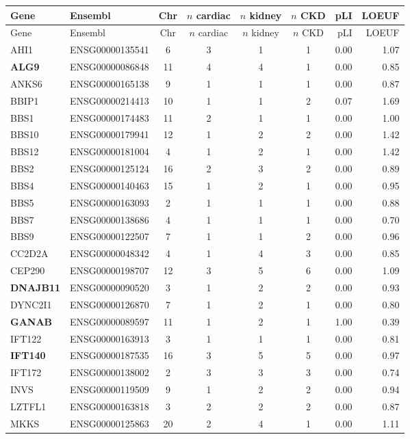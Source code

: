 \documentclass[11pt,a4paper]{article}
\begin{document}
\begin{longtable}{llccccrr}
\toprule
Gene & Ensembl & Chr & $n$ cardiac & $n$ kidney & $n$ CKD & pLI & LOEUF \\
\midrule
\endfirsthead
\toprule
Gene & Ensembl & Chr & $n$ cardiac & $n$ kidney & $n$ CKD & pLI & LOEUF \\
\midrule
\endhead
AHI1 & ENSG00000135541 & 6 & 3 & 1 & 1 & 0.00 & 1.07 \\
\textbf{ALG9} & ENSG00000086848 & 11 & 4 & 4 & 1 & 0.00 & 0.85 \\
ANKS6 & ENSG00000165138 & 9 & 1 & 1 & 1 & 0.00 & 0.87 \\
BBIP1 & ENSG00000214413 & 10 & 1 & 1 & 2 & 0.07 & 1.69 \\
BBS1 & ENSG00000174483 & 11 & 2 & 1 & 1 & 0.00 & 1.00 \\
BBS10 & ENSG00000179941 & 12 & 1 & 2 & 2 & 0.00 & 1.42 \\
BBS12 & ENSG00000181004 & 4 & 1 & 2 & 1 & 0.00 & 1.42 \\
BBS2 & ENSG00000125124 & 16 & 2 & 3 & 2 & 0.00 & 0.89 \\
BBS4 & ENSG00000140463 & 15 & 1 & 2 & 1 & 0.00 & 0.95 \\
BBS5 & ENSG00000163093 & 2 & 1 & 1 & 1 & 0.00 & 0.88 \\
BBS7 & ENSG00000138686 & 4 & 1 & 1 & 1 & 0.00 & 0.70 \\
BBS9 & ENSG00000122507 & 7 & 1 & 1 & 2 & 0.00 & 0.96 \\
CC2D2A & ENSG00000048342 & 4 & 1 & 4 & 3 & 0.00 & 0.85 \\
CEP290 & ENSG00000198707 & 12 & 3 & 5 & 6 & 0.00 & 1.09 \\
\textbf{DNAJB11} & ENSG00000090520 & 3 & 1 & 2 & 2 & 0.00 & 0.93 \\
DYNC2I1 & ENSG00000126870 & 7 & 1 & 2 & 1 & 0.00 & 0.80 \\
\textbf{GANAB} & ENSG00000089597 & 11 & 1 & 2 & 1 & 1.00 & 0.39 \\
IFT122 & ENSG00000163913 & 3 & 1 & 1 & 1 & 0.00 & 0.81 \\
\textbf{IFT140} & ENSG00000187535 & 16 & 3 & 5 & 5 & 0.00 & 0.97 \\
IFT172 & ENSG00000138002 & 2 & 3 & 3 & 3 & 0.00 & 0.74 \\
INVS & ENSG00000119509 & 9 & 1 & 2 & 2 & 0.00 & 0.94 \\
LZTFL1 & ENSG00000163818 & 3 & 2 & 2 & 2 & 0.00 & 0.87 \\
MKKS & ENSG00000125863 & 20 & 2 & 4 & 1 & 0.00 & 1.11 \\

\end{longtable}
\end{document}
